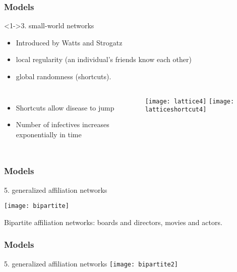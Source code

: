 \begin{frame}
  \frametitle{Models}

  \begin{block}<1->{3. small-world networks}
    \begin{itemize}
    \item Introduced by Watts and Strogatz\cite{watts1998a}
    \end{itemize}
    \medskip
    \begin{itemize}
    \item<3-> \alert{local regularity} (an individual's friends know each other)
    \item<4-> \alert{global randomness} (shortcuts).
    \end{itemize}

    \begin{columns}
      \begin{itemize}
      \item<5-> Shortcuts allow disease to jump
      \item<6-> Number of infectives increases exponentially in time
      \end{itemize}
      \begin{overprint}
        \texttt{[image: lattice4]}
        \texttt{[image: latticeshortcut4]}
      \end{overprint}
    \end{columns}
  \end{block}
  
\end{frame}

\begin{frame}
  \frametitle{Models}

  \begin{block}{5. generalized affiliation networks}
    \begin{center}
      \texttt{[image: bipartite]}
    \end{center}
  \end{block}

  Bipartite affiliation networks: boards and directors, movies and actors.

\end{frame}

\begin{frame}
  \frametitle{Models}

  \begin{block}{5. generalized affiliation networks}
    \centering
    \texttt{[image: bipartite2]}
  \end{block}

\end{frame}

